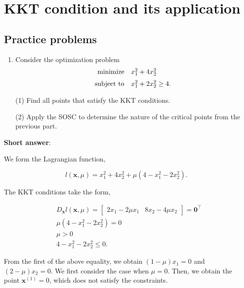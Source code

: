 \section{KKT condition and its application}

\subsection{Practice problems}
\begin{enumerate}
	\item Consider the optimization problem
	\[
		\begin{array}{rl}
			\operatorname{minimize} & x_{1}^{2}+4 x_{2}^{2} \vspace{2mm} \\
			\text { subject to} & x_{1}^{2}+2 x_{2}^{2} \geq 4 .
		\end{array}
	\]
	
	(1) Find all points that satisfy the KKT conditions.
	
	(2) Apply the SOSC to determine the nature of the critical points from the previous part.

\end{enumerate}

\textbf{Short answer}:

We form the Lagrangian function,

\[
	l(\boldsymbol{x}, \mu)=x_{1}^{2}+4 x_{2}^{2}+\mu\left(4-x_{1}^{2}-2 x_{2}^{2}\right) .
\]

The KKT conditions take the form,

\[
	\begin{aligned}
		& D_{\boldsymbol{x}} l(\boldsymbol{x}, \mu)=\left[\begin{array}{ll}
			2 x_{1}-2 \mu x_{1} & 8 x_{2}-4 \mu x_{2}
		\end{array}\right]=\boldsymbol{0}^{\top} \\
		& \mu\left(4-x_{1}^{2}-2 x_{2}^{2}\right)=0 \\
		& \mu>0 \\
		& 4-x_{1}^{2}-2 x_{2}^{2} \leq 0 .
	\end{aligned}
\]

From the first of the above equality, we obtain \((1-\mu) x_{1}=0\) and \((2-\mu) x_{2}=0\). We first consider the case when \(\mu=0\). Then, we obtain the point \(\boldsymbol{x}^{(1)}=0\), which does not satisfy the constraints.

